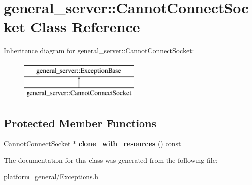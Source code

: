 \hypertarget{classgeneral__server_1_1CannotConnectSocket}{\section{general\-\_\-server\-:\-:\-Cannot\-Connect\-Socket \-Class \-Reference}
\label{classgeneral__server_1_1CannotConnectSocket}
}
\-Inheritance diagram for general\-\_\-server\-:\-:\-Cannot\-Connect\-Socket\-:\begin{figure}[H]
\begin{center}
\leavevmode
\includegraphics[height=2.000000cm]{classgeneral__server_1_1CannotConnectSocket}
\end{center}
\end{figure}
\subsection*{\-Protected \-Member \-Functions}
\begin{DoxyCompactItemize}
\item 
\hypertarget{classgeneral__server_1_1CannotConnectSocket_ade3bddeb32aadb0442ac83446bd9d292}{\hyperlink{classgeneral__server_1_1CannotConnectSocket}{\-Cannot\-Connect\-Socket} $\ast$ {\bfseries clone\-\_\-with\-\_\-resources} () const }\label{classgeneral__server_1_1CannotConnectSocket_ade3bddeb32aadb0442ac83446bd9d292}

\end{DoxyCompactItemize}


\-The documentation for this class was generated from the following file\-:\begin{DoxyCompactItemize}
\item 
platform\-\_\-general/\-Exceptions.\-h\end{DoxyCompactItemize}
